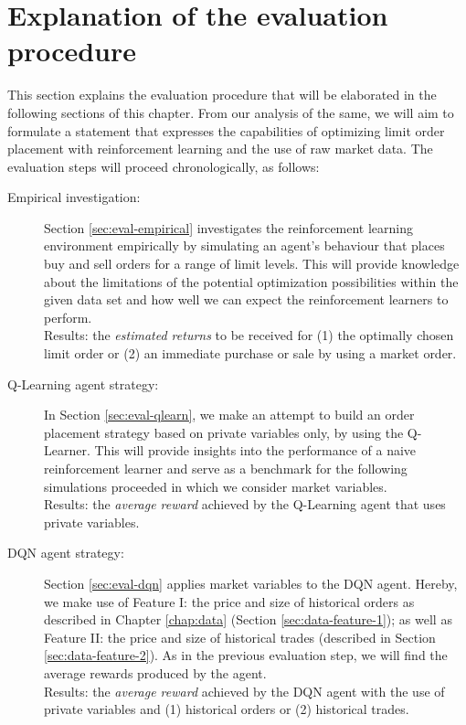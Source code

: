 \section{Explanation of the evaluation procedure}
This section explains the evaluation procedure that will be elaborated in the following sections of this chapter. From our analysis of the same, we will aim to formulate a statement that expresses the capabilities of optimizing limit order placement with reinforcement learning and the use of raw market data.
The evaluation steps will proceed chronologically, as follows:
\begin{description}
    \item[Empirical investigation: ]
    Section \ref{sec:eval-empirical} investigates the reinforcement learning environment empirically by simulating an agent's behaviour that places buy and sell orders for a range of limit levels.
    This will provide knowledge about the limitations of the potential optimization possibilities within the given data set and how well we can expect the reinforcement learners to perform.
    \\
    Results: the \textit{estimated returns} to be received for (1) the optimally chosen limit order or (2) an immediate purchase or sale by using a market order.
    
    \item[Q-Learning agent strategy: ]
    In Section \ref{sec:eval-qlearn}, we make an attempt to build an order placement strategy based on private variables only, by using the Q-Learner.
    This will provide insights into the performance of a naive reinforcement learner and serve as a benchmark for the following simulations proceeded in which we consider market variables.
    \\
    Results: the \textit{average reward} achieved by the Q-Learning agent that uses private variables.

    \item[DQN agent strategy: ]
    Section \ref{sec:eval-dqn} applies market variables to the DQN agent.
    Hereby, we make use of Feature I: the price and size of historical orders as described in Chapter \ref{chap:data} (Section \ref{sec:data-feature-1}); as well as Feature II: the price and size of historical trades (described in Section \ref{sec:data-feature-2}).
    As in the previous evaluation step, we will find the average rewards produced by the agent.
    \\
    Results: the \textit{average reward} achieved by the DQN agent with the use of private variables and (1) historical orders or (2) historical trades.


\end{description}
